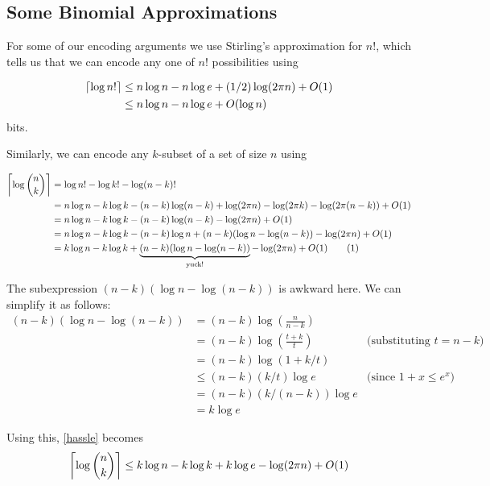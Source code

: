 \documentclass[lotsofwhite]{patmorin}
\newcommand\numberthis{\addtocounter{equation}{1}\tag{\theequation}}
\begin{document}
\subsection{Some Binomial Approximations}

For some of our encoding arguments we use Stirling's approximation for $n!$, 
which tells us that we can encode any one of $n!$ possibilities using

\begin{align}
  \lceil \log n!\rceil 
      & \le n\log n - n\log e + (1/2)\log(2\pi n) + O(1)  
             \eqlabel{stirling-tight} \\
      & \le n\log n - n\log e + O(\log n)  
             \eqlabel{stirling-loose}
\end{align}
bits.

Similarly, we can encode any $k$-subset of a set of size $n$ using

\begin{align*}
  \left\lceil\log \binom{n}{k}\right\rceil 
     & = \log n! - \log k! - \log (n-k)! \\
     & = n\log n - k\log k - (n-k)\log(n-k) + \log(2\pi n) - \log (2\pi k) - \log (2\pi (n-k)) + O(1) \\
     & = n\log n - k\log k - (n-k)\log(n-k) - \log(2\pi n) + O(1)  \\
     & = n\log n - k\log k - (n-k)\log n + (n-k)(\log n-\log(n-k)) - \log(2\pi n) + O(1) \\
     & = k\log n - k\log k + \underbrace{(n-k)(\log n-\log(n-k))}_\text{yuck!}  - \log(2\pi n) + O(1) 
         \numberthis \eqlabel{hassle} \\ 
\end{align*}

The subexpression $(n-k)(\log n-\log(n-k))$ is awkward here. We can
simplify it as follows:
\begin{align*}
   (n-k)(\log n-\log(n-k))
      & = (n-k)\log \left(\frac{n}{n-k}\right) \\
      & = (n-k)\log\left(\frac{t+k}{t}\right) & \text{(substituting $t=n-k$)} \\
      & = (n-k)\log(1+k/t) \\
      & \le (n-k)(k/t)\log e & \text{(since $1+x \le e^x$)} \\
      & = (n-k)(k/(n-k))\log e \\
      & = k\log e 
\end{align*}

Using this, \eqref{hassle} becomes
\begin{equation}
  \left\lceil\log \binom{n}{k}\right\rceil 
    \le k\log n - k\log k + k\log e - \log (2\pi n) + O(1) \eqlabel{log-n-choose-k}
\end{equation} 
\end{document}
